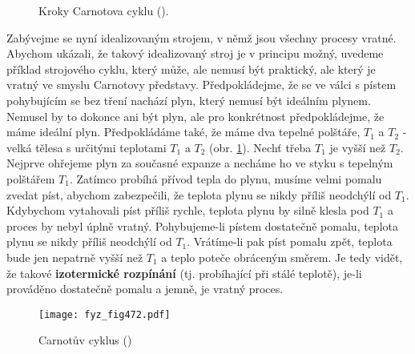     \begin{figure}[hb!] %
      \centering
        \newline
        \newline
        \newline
      \caption{Kroky Carnotova cyklu (\cite[s.~601]{Feynman01}).}
      \label{fyz:fig471}
    \end{figure}

    Zabývejme se nyní idealizovaným strojem, v němž jsou všechny procesy vratné. Abychom ukázali, že
    takový idealizovaný stroj je v principu možný, uvedeme příklad strojového cyklu, který může, ale
    nemusí být praktický, ale který je vratný ve smyslu Carnotovy představy. Předpokládejme, že se
    ve válci s pístem pohybujícím se bez tření nachází plyn, který nemusí být ideálním plynem.
    Nemusel by to dokonce ani být plyn, ale pro konkrétnost předpokládejme, že máme ideální plyn.
    Předpokládáme také, že máme dva tepelné polštáře, \(T_1\) a \(T_2\) - velká tělesa s určitými
    teplotami \(T_1\) a \(T_2\) (obr. \ref{fyz:fig471}). Nechť třeba \(T_1\) je vyšší než \(T_2\).
    Nejprve ohřejeme plyn za současné expanze a necháme ho ve styku s tepelným polštářem \(T_1\).
    Zatímco probíhá přívod tepla do plynu, musíme velmi pomalu zvedat píst, abychom zabezpečili, že
    teplota plynu se nikdy příliš neodchýlí od \(T_1\). Kdybychom vytahovali píst příliš rychle,
    teplota plynu by silně klesla pod \(T_1\) a proces by nebyl úplně vratný. Pohybujeme-li pístem
    dostatečně pomalu, teplota plynu se nikdy příliš neodchýlí od \(T_1\). Vrátíme-li pak píst
    pomalu zpět, teplota bude jen nepatrně vyšší než \(T_1\) a teplo poteče obráceným směrem. Je
    tedy vidět, že takové \textbf{izotermické rozpínání} (tj. probíhající při stálé teplotě), je-li
    prováděno dostatečně pomalu a jemně, je vratný proces.

    \begin{figure}[ht!] %
      \centering
      \texttt{[image: fyz\_fig472.pdf]}
      \caption{Carnotův cyklus (\cite[s.~707]{Feynman01})}
      \label{fyz:fig472}
    \end{figure}

